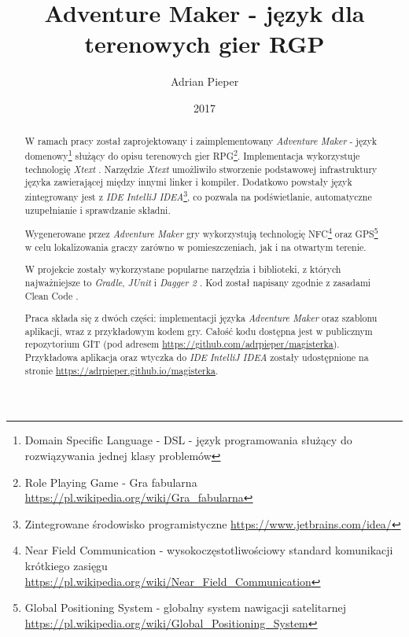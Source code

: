 \documentclass[openright]{xmgr}
\author   {Adrian Pieper}
\title    {Adventure Maker - język dla terenowych gier RGP}
\date     {2017}
\begin{document}
\begin{abstract}
  W ramach pracy został zaprojektowany i zaimplementowany \textit{Adventure Maker} - język domenowy\footnote{Domain Specific Language - DSL - język programowania służący do rozwiązywania jednej klasy problemów} służący do opisu terenowych gier RPG\footnote{Role Playing Game - Gra fabularna \url{https://pl.wikipedia.org/wiki/Gra_fabularna}}. Implementacja wykorzystuje technologię \textit{Xtext} \cite{Xtext:2017:Doc}. Narzędzie \textit{Xtext} umożliwiło stworzenie podstawowej infrastruktury języka zawierającej między innymi linker i kompiler. Dodatkowo powstały język zintegrowany jest z \textit{IDE IntelliJ IDEA}\footnote{Zintegrowane środowisko programistyczne \url{https://www.jetbrains.com/idea/}}, co pozwala na podświetlanie, automatyczne uzupełnianie i sprawdzanie składni.
  
  Wygenerowane przez \textit{Adventure Maker} gry wykorzystują technologię NFC\footnote{Near Field Communication - wysokoczęstotliwościowy standard komunikacji krótkiego zasięgu \url{https://pl.wikipedia.org/wiki/Near_Field_Communication}} oraz GPS\footnote{Global Positioning System - globalny system nawigacji satelitarnej \url{https://pl.wikipedia.org/wiki/Global_Positioning_System}} w celu lokalizowania graczy zarówno w pomieszczeniach, jak i na otwartym terenie. 
  
  W projekcie zostały wykorzystane popularne narzędzia i biblioteki, z których najważniejsze to \textit{Gradle}\cite{Gradle:2017:Doc}, \textit{JUnit}\cite{JUnit:2017:Doc} i \textit{Dagger 2} \cite{Dagger2:2017:Doc}. Kod został napisany zgodnie z zasadami Clean Code \cite{CleanCode:2005}.
  
  Praca składa się z dwóch części: implementacji języka \textit{Adventure Maker} oraz szablonu aplikacji, wraz z przykładowym kodem gry. Całość kodu dostępna jest w publicznym repozytorium GIT (pod adresem \url{https://github.com/adrpieper/magisterka}). Przykładowa aplikacja oraz wtyczka do \textit{IDE IntelliJ IDEA} zostały udostępnione na stronie \url{https://adrpieper.github.io/magisterka}.
\end{abstract}


\maketitle

\introduction
\end{document}
